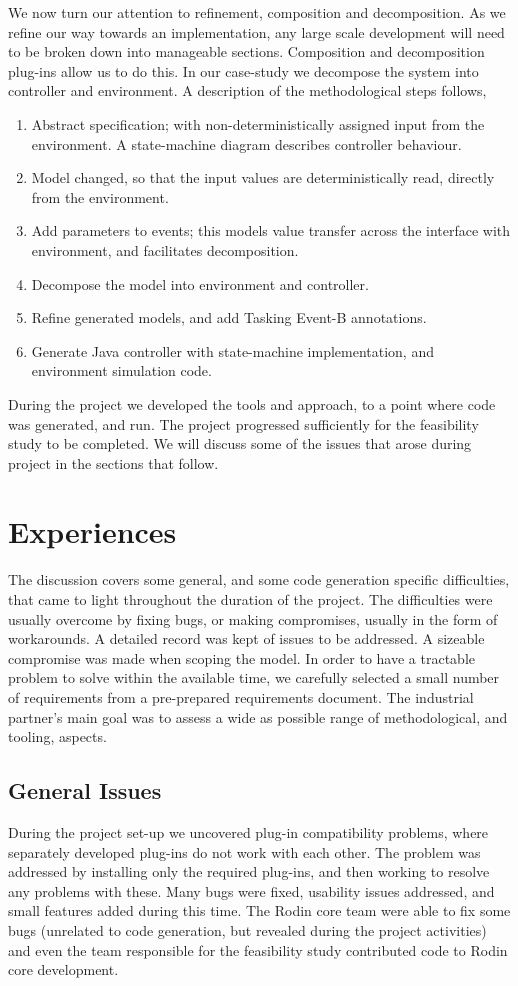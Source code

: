 \documentclass{llncs}%
\begin{document}
We now turn our attention to refinement, composition and decomposition. As we refine our way towards an implementation, any large scale development will need to be broken down into manageable sections. Composition and decomposition~\cite{decomp2010c} plug-ins allow us to do this. In our case-study we decompose the system into controller and environment. A description of the methodological steps follows, 
%
\begin{enumerate}[noitemsep]
\item Abstract specification; with non-deterministically assigned input from the environment. A state-machine diagram describes controller behaviour.
\item Model changed, so that the input values are deterministically read, directly from the environment.
\item Add parameters to events; this models value transfer across the interface with environment, and facilitates decomposition.
\item Decompose the model into environment and controller.
\item Refine generated models, and add Tasking Event-B annotations.
\item Generate Java controller with state-machine implementation, and environment simulation code.
\end{enumerate}
%
During the project we developed the tools and approach, to a point where code was generated, and run. The project progressed sufficiently for the feasibility study to be completed. We will discuss some of the issues that arose during project in the sections that follow.
%
%
\section{Experiences}\label{Experience}
The discussion covers some general, and some code generation specific difficulties, that came to light throughout the duration of the project. The difficulties were usually overcome by fixing bugs, or making compromises, usually in the form of workarounds. A detailed record was kept of issues to be addressed. A sizeable compromise was made when scoping the model. In order to have a tractable problem to solve within the available time, we carefully selected a small number of requirements from a pre-prepared requirements document. The industrial partner's main goal was to assess a wide as possible range of methodological, and tooling, aspects. 

\subsection{General Issues} During the project set-up we uncovered plug-in compatibility problems, where separately developed plug-ins do not work with each other. The problem was addressed by installing only the required plug-ins, and then working to resolve any problems with these. Many bugs were fixed, usability issues addressed, and small features added during this time.  The Rodin core team were able to fix some bugs (unrelated to code generation, but revealed during the project activities) and even the team responsible for the feasibility study contributed code to Rodin core development. 
\end{document}
